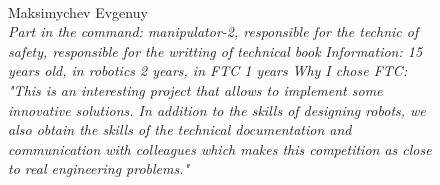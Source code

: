 \begin{figure}[H]
\begin{minipage}[h]{0.47\linewidth}
	\end{minipage}
	\hfill
	\begin{minipage}[h]{0.47\linewidth}
		\\
		Maksimychev Evgenuy\\
		\emph{Part in the command: manipulator-2, responsible for the technic of safety, responsible for the writting of technical book}
		\emph{Information: 15 years old, in robotics 2 years, in FTC 1 years}
		\emph{Why I chose FTC: "This is an interesting project that allows to implement some innovative solutions. In addition to the skills of designing robots, we also obtain the skills of the technical documentation and communication with colleagues which makes this competition as close to real engineering problems."}
	\end{minipage}
	\begin{minipage}[h]{0.47\linewidth}

\end{minipage}
\end{figure}
